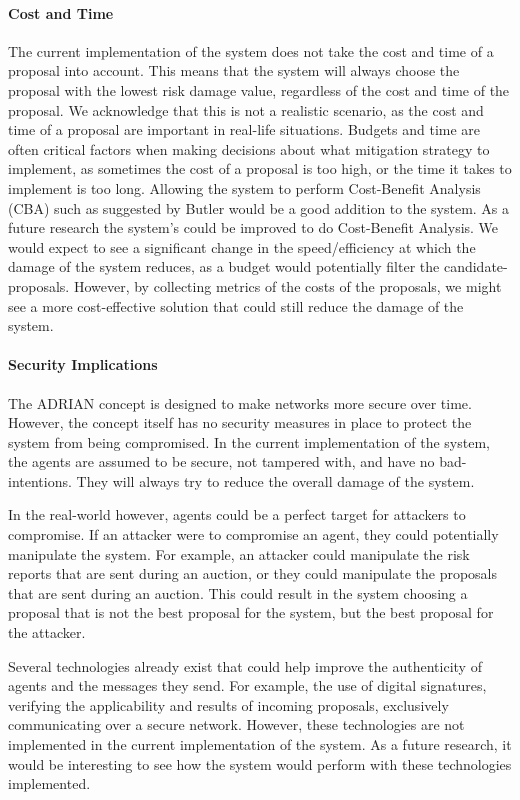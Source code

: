 \paragraph{Cost and Time}
The current implementation of the system does not take the cost and time of a proposal into account. This means that the system will always choose the proposal with the lowest risk damage value, regardless of the cost and time of the proposal. We acknowledge that this is not a realistic scenario, as the cost and time of a proposal are important in real-life situations. Budgets and time are often critical factors when making decisions about what mitigation strategy to implement, as sometimes the cost of a proposal is too high, or the time it takes to implement is too long. Allowing the system to perform Cost-Benefit Analysis (CBA) such as suggested by Butler \cite{butler2002security} would be a good addition to the system. As a future research the system's  could be improved to do Cost-Benefit Analysis. We would expect to see a significant change in the speed/efficiency at which the damage of the system reduces, as a budget would potentially filter the candidate-proposals. However, by collecting metrics of the costs of the proposals, we might see a more cost-effective solution that could still reduce the damage of the system.

\paragraph{Security Implications}
The ADRIAN concept is designed to make networks more secure over time. However, the concept itself has no security measures in place to protect the system from being compromised. In the current implementation of the system, the agents are assumed to be secure, not tampered with, and have no bad-intentions. They will always try to reduce the overall damage of the system.

In the real-world however, agents could be a perfect target for attackers to compromise. If an attacker were to compromise an agent, they could potentially manipulate the system. For example, an attacker could manipulate the risk reports that are sent during an auction, or they could manipulate the proposals that are sent during an auction. This could result in the system choosing a proposal that is not the best proposal for the system, but the best proposal for the attacker.

Several technologies already exist that could help improve the authenticity of agents and the messages they send. For example, the use of digital signatures, verifying the applicability and results of incoming proposals, exclusively communicating over a secure network. However, these technologies are not implemented in the current implementation of the system. As a future research, it would be interesting to see how the system would perform with these technologies implemented. 
